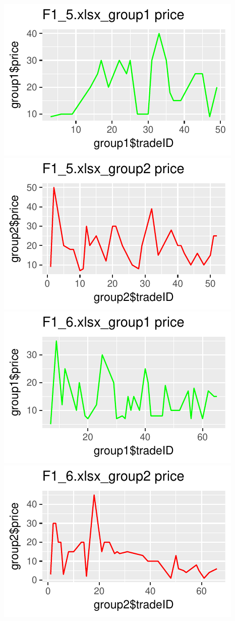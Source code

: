 \documentclass[]{article}
\begin{document}
\includegraphics{finance_homework_files/figure-latex/unnamed-chunk-3-9.pdf}
\includegraphics{finance_homework_files/figure-latex/unnamed-chunk-3-10.pdf}
\includegraphics{finance_homework_files/figure-latex/unnamed-chunk-3-11.pdf}
\includegraphics{finance_homework_files/figure-latex/unnamed-chunk-3-12.pdf}
\end{document}
